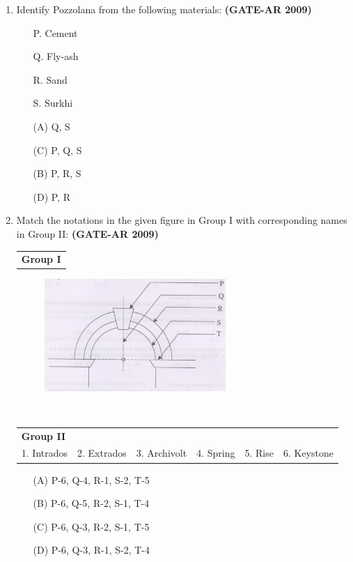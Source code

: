 \documentclass[a4paper,10pt]{article}
\begin{document}
\begin{enumerate}
    \item Identify Pozzolana from the following materials: \textbf{(GATE-AR 2009)}
    \begin{itemize}
        \item[P.] Cement
        \item[Q.] Fly-ash
        \item[R.] Sand
        \item[S.] Surkhi
    \end{itemize}
    \begin{multicols}{2}
	\begin{itemize}
        \item[(A)] Q, S
        \item[(C)] P, Q, S
        \item[(B)] P, R, S
        \item[(D)] P, R
    \end{itemize}
	\end{multicols}

	\item Match the notations in the given figure in Group I with corresponding names in Group II: \textbf{(GATE-AR 2009)} \\
    \begin{tabular}{ l }
	\textbf{Group I} \\
	\end{tabular}
	\begin{figure}[h!]
        \centering
        \includegraphics[width=0.65\textwidth]{Pic04.jpg}
	\end{figure} \\
	\begin{tabular}{ l l l l l l }
	\textbf{Group II} & & & & & \\
	1. Intrados & 2. Extrados & 3. Archivolt & 4. Spring & 5. Rise & 6. Keystone \\
	\end{tabular}	
	\begin{itemize}
        \item[(A)] P-6, Q-4, R-1, S-2, T-5
        \item[(B)] P-6, Q-5, R-2, S-1, T-4
        \item[(C)] P-6, Q-3, R-2, S-1, T-5
        \item[(D)] P-6, Q-3, R-1, S-2, T-4
    \end{itemize}


\end{enumerate}
\end{document}
